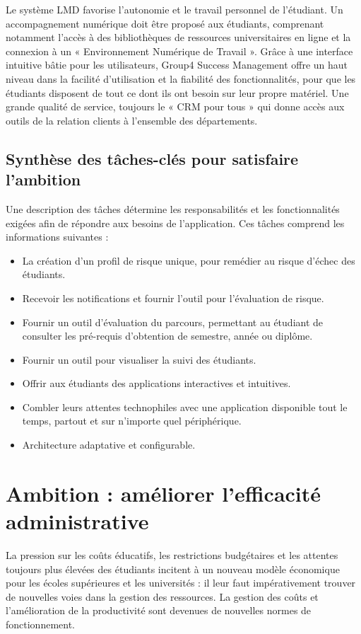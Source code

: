 Le système LMD favorise l'autonomie et le travail personnel de l'étudiant. Un accompagnement numérique doit être proposé aux étudiants, comprenant notamment l'accès à des bibliothèques de ressources universitaires en ligne et la connexion à un « Environnement Numérique de Travail ». Grâce à une interface intuitive bâtie pour les utilisateurs, Group4 Success Management offre un haut niveau dans la facilité d'utilisation et la fiabilité des fonctionnalités, pour que les étudiants disposent de tout ce dont ils ont besoin sur leur propre matériel. Une grande qualité de service, toujours le « CRM pour tous » qui donne accès aux outils de la relation clients à l'ensemble des départements.

\subsection{Synthèse des tâches-clés pour satisfaire l'ambition}
Une description des tâches détermine les responsabilités et les fonctionnalités exigées afin de répondre aux besoins de l'application. Ces tâches comprend les informations suivantes :

\begin{itemize}
	\item La création d'un profil de risque unique, pour remédier au risque d'échec des étudiants.
	\item Recevoir les notifications et fournir l'outil pour l'évaluation de risque.
	\item Fournir un outil d'évaluation du parcours, permettant au étudiant de consulter les pré-requis d'obtention de semestre, année ou diplôme.
	\item Fournir un outil pour visualiser la suivi des étudiants.
	\item Offrir aux étudiants des applications interactives et intuitives.
	\item Combler leurs attentes technophiles avec une application disponible tout le temps, partout et sur n'importe quel périphérique.
	\item Architecture adaptative et configurable.
\end{itemize}
 
\section{Ambition : améliorer l'efficacité administrative}
La pression sur les coûts éducatifs, les restrictions budgétaires et les attentes toujours plus élevées des étudiants incitent à un nouveau modèle économique pour les écoles supérieures et les universités : il leur faut impérativement trouver de nouvelles voies dans la gestion des ressources. La gestion des coûts et l'amélioration de la productivité sont devenues de nouvelles normes de fonctionnement.
\medskip


